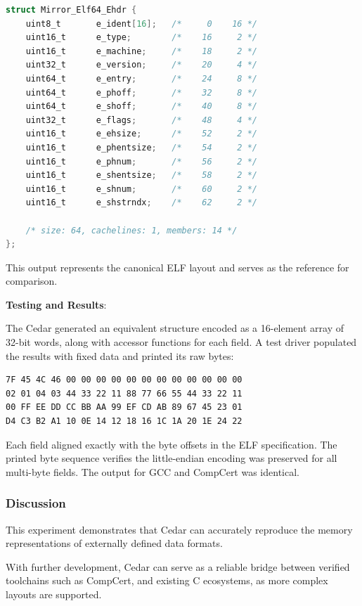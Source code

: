 \begin{lstlisting}[language=C, caption={Pahole output for the ELF64 header}, label=lst:elf64hdr_pahole]
struct Mirror_Elf64_Ehdr {
    uint8_t       e_ident[16];   /*     0    16 */
    uint16_t      e_type;        /*    16     2 */
    uint16_t      e_machine;     /*    18     2 */
    uint32_t      e_version;     /*    20     4 */
    uint64_t      e_entry;       /*    24     8 */
    uint64_t      e_phoff;       /*    32     8 */
    uint64_t      e_shoff;       /*    40     8 */
    uint32_t      e_flags;       /*    48     4 */
    uint16_t      e_ehsize;      /*    52     2 */
    uint16_t      e_phentsize;   /*    54     2 */
    uint16_t      e_phnum;       /*    56     2 */
    uint16_t      e_shentsize;   /*    58     2 */
    uint16_t      e_shnum;       /*    60     2 */
    uint16_t      e_shstrndx;    /*    62     2 */

    /* size: 64, cachelines: 1, members: 14 */
};
\end{lstlisting}

This output represents the canonical ELF layout and serves
as the reference for comparison.

\textbf{Testing and Results}:

The Cedar generated an equivalent structure encoded as a 16-element
array of 32-bit words, along with accessor functions for each field.
A test driver populated the results with fixed data and printed its
raw bytes:

\begin{verbatim}
7F 45 4C 46 00 00 00 00 00 00 00 00 00 00 00 00  
02 01 04 03 44 33 22 11 88 77 66 55 44 33 22 11  
00 FF EE DD CC BB AA 99 EF CD AB 89 67 45 23 01  
D4 C3 B2 A1 10 0E 14 12 18 16 1C 1A 20 1E 24 22
\end{verbatim}

Each field aligned exactly with the byte offsets in the ELF
specification. The printed byte sequence verifies the little-endian
encoding was preserved for all multi-byte fields.
The output for GCC and CompCert was identical.

\subsubsection{Discussion}
This experiment demonstrates that Cedar can accurately reproduce the memory
representations of externally defined data formats.

With further development,
Cedar can serve as a reliable bridge between verified toolchains such as CompCert,
and existing C ecosystems, as more complex layouts are supported.

